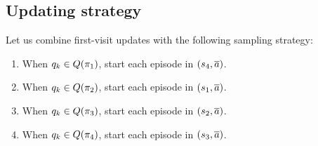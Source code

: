 

\subsection{Updating strategy}
\label{sec: 4s counter sampling}

\vspace{-0.3cm}



Let us combine first-visit updates with the following sampling strategy:
\vspace{-0.9cm}
\begin{enumerate}
    \item \label{pg: sampling 4 state}
    When $q_{k} \in Q(\pi_1)$, start each episode in $(s_4, \overline{a})$.

    \item
    When $q_{k} \in Q(\pi_2)$, start each episode in $(s_1, \overline{a})$.

    \item
    When $q_{k} \in Q(\pi_3)$, start each episode in $(s_2, \overline{a})$.

    \item
    When $q_{k} \in Q(\pi_4)$, start each episode in $(s_3, \overline{a})$.
\end{enumerate}
